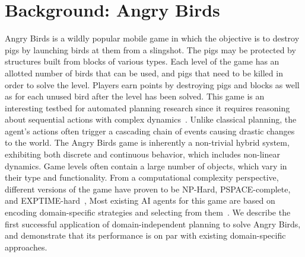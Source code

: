 \documentclass[letterpaper]{article} %
\begin{document}
\section{Background: Angry Birds}
Angry Birds is a wildly popular mobile game in which the objective is to destroy pigs by launching birds at them from a slingshot. The pigs may be protected by structures built from blocks of various types. Each level of the game has an allotted number of birds that can be used, and pigs that need to be killed in order to solve the level.
Players earn points by destroying pigs and blocks as well as for each unused bird after the level has been solved.
This game is an interesting testbed for automated planning research since it 
requires reasoning about sequential actions with complex dynamics~\cite{renz2019ai}. 
Unlike classical planning, the agent's actions often trigger a cascading chain of events causing drastic changes to the world. 
The Angry Birds game is inherently a non-trivial hybrid system, exhibiting both discrete and continuous behavior, which includes non-linear dynamics. 
Game levels often contain a large number of objects, which vary in their type and functionality.
From a computational complexity perspective, different versions of the game have proven to be NP-Hard, PSPACE-complete, and EXPTIME-hard~\cite{stephenson2020computational},
Most existing AI agents for this game are based on encoding domain-specific strategies and selecting from them~\cite{borovicka2014datalab,wang2017description}. 
We describe the first successful application of domain-independent planning to solve Angry Birds, 
and demonstrate that its performance is on par with existing domain-specific approaches. 
\end{document}
